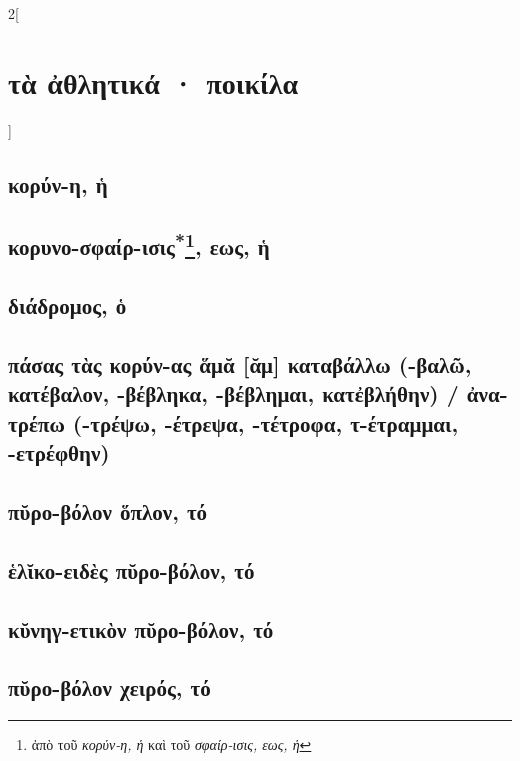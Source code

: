 \documentclass{book}
\begin{document}
\begin{multicols}{2}[\section{τὰ ἀθλητικά · ποικίλα}]
\subsection{κορύν-η, ἡ}
\subsection{κορυνο-σφαίρ-ισις\textsuperscript{*}\protect\footnote{ἀπὸ τοῦ \emph{κορύν-η, ἡ} καὶ τοῦ \emph{σφαίρ-ισις, εως, ἡ}}, εως, ἡ}
\subsection{διάδρομος, ὁ}
\subsection{πάσας τὰς κορύν-ας ἅμᾰ [ᾰμ] καταβάλλω 
(-βαλῶ, κατέβαλον, -βέβληκα, -βέβλημαι, κατἐβλήθην)  /
ἀνα-τρέπω (-τρέψω, -έτρεψα, -τέτροφα, τ-έτραμμαι, -ετρέφθην)}
\subsection{πῠρο-βόλον ὅπλον, τό}
\subsection{ἑλῐκο-ειδὲς πῠρο-βόλον, τό}
\subsection{κῠνηγ-ετικὸν πῠρο-βόλον, τό}
\subsection{πῠρο-βόλον χειρός, τό}

\end{multicols}
\end{document}
